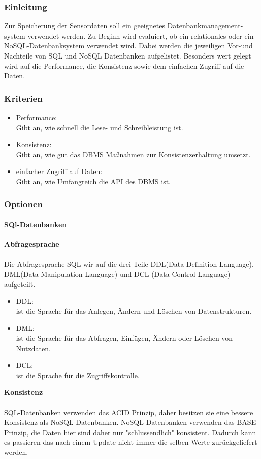 \documentclass[11pt]{article}
\begin{document}
\subsubsection{Einleitung}
Zur Speicherung der Sensordaten soll ein geeignetes Datenbankmanagement-\\ system verwendet werden. Zu Beginn wird evaluiert, ob ein relationales oder ein NoSQL-Datenbanksystem verwendet wird. Dabei werden die jeweiligen Vor-und Nachteile von SQL und NoSQL Datenbanken aufgelistet. Besonders wert gelegt wird auf die Performance, die Konsistenz sowie dem einfachen Zugriff auf die Daten.

\subsubsection{Kriterien}

\begin{itemize}
	\item Performance: \\Gibt an, wie schnell die Lese- und Schreibleistung ist.
	\item Konsistenz: \\Gibt an, wie gut das DBMS Ma{\ss}nahmen zur Konsistenzerhaltung umsetzt.
	\item einfacher Zugriff auf Daten: \\Gibt an, wie Umfangreich die API des DBMS ist.
\end{itemize}

\subsubsection{Optionen}

\paragraph{SQl-Datenbanken}

\textbf{Abfragesprache}\\\\
Die Abfragesprache SQL wir auf die drei Teile DDL(Data Definition Language),
DML(Data Manipulation Language) und DCL (Data Control Language) aufgeteilt.

\begin{itemize}
	\item DDL:\\ ist die Sprache f\"ur das Anlegen, \"Andern und L\"oschen von Datenstrukturen.
	\item DML:\\ ist die Sprache f\"ur das Abfragen, Einf\"ugen, \"Andern oder L\"oschen von Nutzdaten.
	\item DCL:\\ ist die Sprache f\"ur die Zugriffskontrolle.
\end{itemize}
\textbf{Konsistenz}\\\\
SQL-Datenbanken verwenden das ACID Prinzip, daher besitzen sie eine bessere Konsistenz als
NoSQL-Datenbanken. NoSQL Datenbanken verwenden das BASE Prinzip, die Daten hier sind daher
nur "schlussendlich" konsistent. Dadurch kann es passieren das nach einem Update nicht immer
die selben Werte zur\"uckgeliefert werden.
\end{document}
